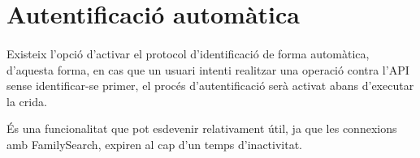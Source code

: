 \section{Autentificació automàtica}

    \paragraph{}
    Existeix l’opció d'activar el protocol d'identificació de forma automàtica, d'aquesta forma, en cas que un usuari intenti realitzar una operació contra l’API sense i\-den\-ti\-fi\-car-se primer, el procés d'autentificació serà activat abans d’executar la crida.

    És una funcionalitat que pot esdevenir relativament útil, ja que les connexions amb FamilySearch, expiren al cap d'un temps d'inactivitat.
